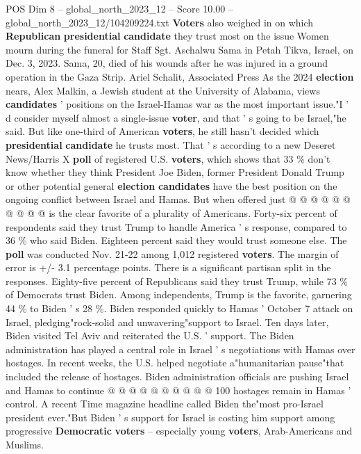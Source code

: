 \begin{textsample}{POS Dim 8 – global\_north\_2023\_12 – Score 10.00 – global\_north\_2023\_12/104209224.txt}  \label{ex:f8_pos_114}
\textbf{Voters} also weighed in on which \textbf{Republican} \textbf{presidential} \textbf{candidate} they trust most on the issue Women mourn during the funeral for Staff Sgt.
Aschalwu Sama in Petah Tikva, Israel, on Dec. 3, 2023.
Sama, 20, died of his wounds after he was injured in a ground operation in the Gaza Strip.
Ariel Schalit, Associated Press As the 2024 \textbf{election} nears, Alex Malkin, a Jewish student at the University of Alabama, views \textbf{candidates} ' positions on the Israel-Hamas war as the most important issue."I ' d consider myself almost a single-issue \textbf{voter}, and that ' s going to be Israel,"he said.
But like one-third of American \textbf{voters}, he still hasn't decided which \textbf{presidential} \textbf{candidate} he trusts most.
That ' s according to a new Deseret News/Harris X \textbf{poll} of registered U.S. \textbf{voters}, which shows that 33 \% don't know whether they think President Joe Biden, former President Donald Trump or other potential general \textbf{election} \textbf{candidates} have the best position on the ongoing conflict between Israel and Hamas.
But when offered just @ @ @ @ @ @ @ @ @ @ is the clear favorite of a plurality of Americans.
Forty-six percent of respondents said they trust Trump to handle America ' s response, compared to 36 \% who said Biden.
Eighteen percent said they would trust someone else.
The \textbf{poll} was conducted Nov. 21-22 among 1,012 registered \textbf{voters}.
The margin of error is +/- 3.1 percentage points.
There is a significant partisan split in the responses.
Eighty-five percent of Republicans said they trust Trump, while 73 \% of Democrats trust Biden.
Among independents, Trump is the favorite, garnering 44 \% to Biden ' s 28 \%.
Biden responded quickly to Hamas ' October 7 attack on Israel, pledging"rock-solid and unwavering"support to Israel.
Ten days later, Biden visited Tel Aviv and reiterated the U.S. ' support.
The Biden administration has played a central role in Israel ' s negotiations with Hamas over hostages.
In recent weeks, the U.S. helped negotiate a"humanitarian pause"that included the release of hostages.
Biden administration officials are pushing Israel and Hamas to continue @ @ @ @ @ @ @ @ @ @ 100 hostages remain in Hamas ' control.
A recent Time magazine headline called Biden the"most pro-Israel president ever."But Biden ' s support for Israel is costing him support among progressive \textbf{Democratic} \textbf{voters} -- especially young \textbf{voters}, Arab-Americans and Muslims.

\end{textsample}
